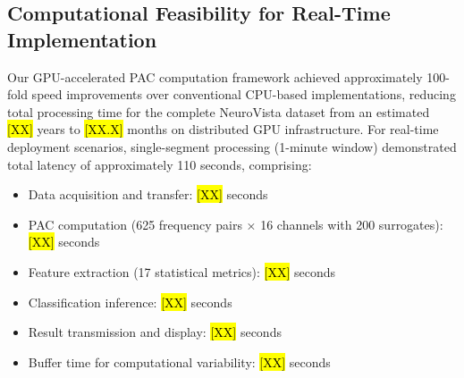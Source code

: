 






\subsection{Computational Feasibility for Real-Time Implementation}
Our GPU-accelerated PAC computation framework \cite{Combrisson2020TensorpacAOAH} achieved approximately 100-fold speed improvements over conventional CPU-based implementations, reducing total processing time for the complete NeuroVista dataset from an estimated \hl{[XX]} years to \hl{[XX.X]} months on distributed GPU infrastructure. For real-time deployment scenarios, single-segment processing (1-minute window) demonstrated total latency of approximately 110 seconds, comprising:
\begin{itemize}
\item Data acquisition and transfer: \hl{[XX]} seconds
\item PAC computation (625 frequency pairs × 16 channels with 200 surrogates): \hl{[XX]} seconds
\item Feature extraction (17 statistical metrics): \hl{[XX]} seconds
\item Classification inference: \hl{[XX]} seconds
\item Result transmission and display: \hl{[XX]} seconds
\item Buffer time for computational variability: \hl{[XX]} seconds
\end{itemize}

